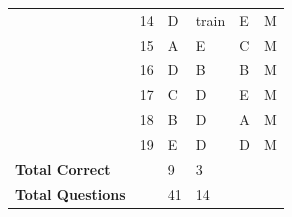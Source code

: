 \documentclass[pageno]{final_paper}
\begin{document}
\begin{table}[]
\begin{tabular}{@{}llllll@{}}
\textbf{}               & 14                                  & D                                          & train                                       & E                                           & M                                       \\
\textbf{}               & 15                                  & A                                          & E                                           & C                                           & M                                       \\
\textbf{}               & 16                                  & D                                          & B                                           & B                                           & M                                       \\
\textbf{}               & 17                                  & C                                          & D                                           & E                                           & M                                       \\
\textbf{}               & 18                                  & B                                          & D                                           & A                                           & M                                       \\
\textbf{}               & 19                                  & E                                          & D                                           & D                                           & M                                       \\ \midrule
\textbf{Total Correct}  &                                     & 9                                          & 3                                           &                                             &                                         \\
\textbf{Total Questions} &                                     & 41                                         & 14                                          &                                             &                                         \\ \bottomrule
\end{tabular}
\end{table}
\end{document}
